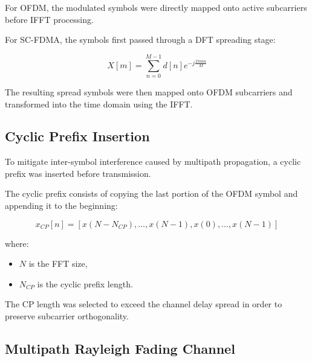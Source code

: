 For OFDM, the modulated symbols were directly mapped onto active
subcarriers before IFFT processing.

For SC-FDMA, the symbols first passed through a DFT spreading stage:

\begin{equation}
X[m]=\sum_{n=0}^{M-1}
d[n]e^{-j\frac{2\pi mn}{M}}
\end{equation}

The resulting spread symbols were then mapped onto OFDM subcarriers and
transformed into the time domain using the IFFT.

\subsection{Cyclic Prefix Insertion}

To mitigate inter-symbol interference caused by multipath propagation,
a cyclic prefix was inserted before transmission.

The cyclic prefix consists of copying the last portion of the OFDM symbol
and appending it to the beginning:

\begin{equation}
x_{CP}[n]=
[x(N-N_{CP}),\dots,x(N-1),x(0),\dots,x(N-1)]
\end{equation}

where:
\begin{itemize}
    \item $N$ is the FFT size,
    \item $N_{CP}$ is the cyclic prefix length.
\end{itemize}

The CP length was selected to exceed the channel delay spread in order to
preserve subcarrier orthogonality.



\subsection{Multipath Rayleigh Fading Channel}

